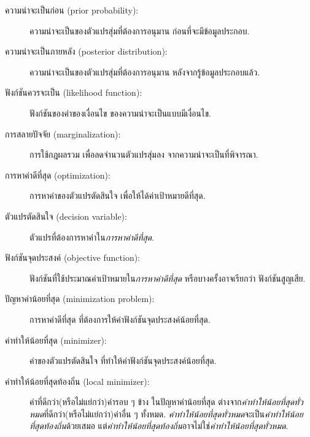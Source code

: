 \begin{description}
\item[ความน่าจะเป็นก่อน (prior probability):]
 
ความน่าจะเป็นของตัวแปรสุ่มที่ต้องการอนุมาน ก่อนที่จะมีข้อมูลประกอบ.

\item[ความน่าจะเป็นภายหลัง (posterior distribution):]
 
ความน่าจะเป็นของตัวแปรสุ่มที่ต้องการอนุมาน หลังจากรู้ข้อมูลประกอบแล้ว.

\item[ฟังก์ชันควรจะเป็น (likelihood function):]
 
ฟังก์ชันของค่าของเงื่อนไข
ของความน่าจะเป็นแบบมีเงื่อนไข.

\item[การสลายปัจจัย (marginalization):]
 
การใช้กฎผลรวม เพื่อลดจำนวนตัวแปรสุ่มลง
จากความน่าจะเป็นที่พิจารณา. 

	
	\item[การหาค่าดีที่สุด (optimization):] 
	การหาค่าของตัวแปรตัดสินใจ เพื่อให้ได้ค่าเป้าหมายดีที่สุด.

	\item[ตัวแปรตัดสินใจ (decision variable):]
	ตัวแปรที่ต้องการหาค่าใน\textit{การหาค่าดีที่สุด}.
	
	\item[ฟังก์ชันจุดประสงค์ (objective function):]
	ฟังก์ชันที่ใช้ประมาณค่าเป้าหมายใน\textit{การหาค่าดีที่สุด} หรือบางครั้งอาจเรียกว่า ฟังก์ชันสูญเสีย.

	\item[ปัญหาค่าน้อยที่สุด (minimization problem):]
	การหาค่าดีที่สุด ที่ต้องการให้ค่าฟังก์ชันจุดประสงค์น้อยที่สุด.
	
	\item[ค่าทำให้น้อยที่สุด (minimizer):]
	ค่าของตัวแปรตัดสินใจ ที่ทำให้ค่าฟังก์ชันจุดประสงค์น้อยที่สุด.
	
	\item[ค่าทำให้น้อยที่สุดท้องถิ่น (local minimizer):]
	ค่าที่ดีกว่า(หรือไม่แย่กว่า)ค่ารอบ ๆ ข้าง ในปัญหาค่าน้อยที่สุด
	ต่างจาก\textit{ค่าทำให้น้อยที่สุดทั่วหมด}ที่ดีกว่า(หรือไม่แย่กว่า)ค่าอื่น ๆ ทั้งหมด.
	\textit{ค่าทำให้น้อยที่สุดทั่วหมด}จะเป็น\textit{ค่าทำให้น้อยที่สุดท้องถิ่น}ด้วยเสมอ
	แต่\textit{ค่าทำให้น้อยที่สุดท้องถิ่น}อาจไม่ใช่\textit{ค่าทำให้น้อยที่สุดทั่วหมด}.
	

\end{description}
